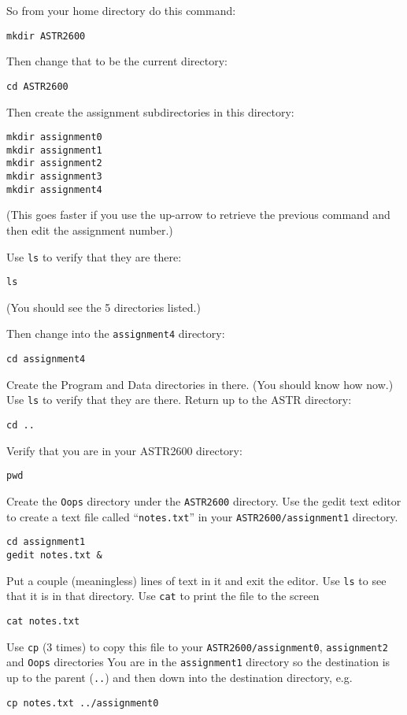 \documentclass{article}
\begin{document}
\begin{spacing}{1.0}
So from your home directory do this command:

\verb|mkdir ASTR2600|

Then change that to be the current directory:

\verb|cd ASTR2600|

Then create the assignment subdirectories in this directory:

\begin{verbatim}
mkdir assignment0
mkdir assignment1
mkdir assignment2
mkdir assignment3
mkdir assignment4
\end{verbatim}

(This goes faster if you use the up-arrow to retrieve the previous command and then edit the assignment number.)

Use \texttt{ls} to verify that they are there:

\verb|ls |

(You should see the 5 directories listed.)

Then change into the \verb|assignment4| directory:

\verb|cd assignment4|

Create the Program and Data directories in there.  (You should know how now.)
Use \verb|ls| to verify that they are there.
Return up to the ASTR directory:

\verb|cd ..|

Verify that you are in your ASTR2600 directory:

\verb|pwd|

Create the \verb|Oops| directory under the \verb|ASTR2600| directory.
Use the gedit text editor to create a text file called “\verb|notes.txt|” in your \verb|ASTR2600/assignment1| directory.

\begin{verbatim}
cd assignment1
gedit notes.txt &
\end{verbatim}

Put a couple (meaningless) lines of text in it and exit the editor.
Use \verb|ls| to see that it is in that directory.
Use \verb|cat| to print the file to the screen

\verb|cat notes.txt|

Use \verb|cp| (3 times) to copy this file to your \verb|ASTR2600/assignment0|, \verb|assignment2| and \verb|Oops| directories
You are in the \verb|assignment1| directory so the destination is up to the parent (\verb|..|) and then down into the destination directory, e.g.

\verb|cp notes.txt ../assignment0|


\end{spacing}
\end{document}
